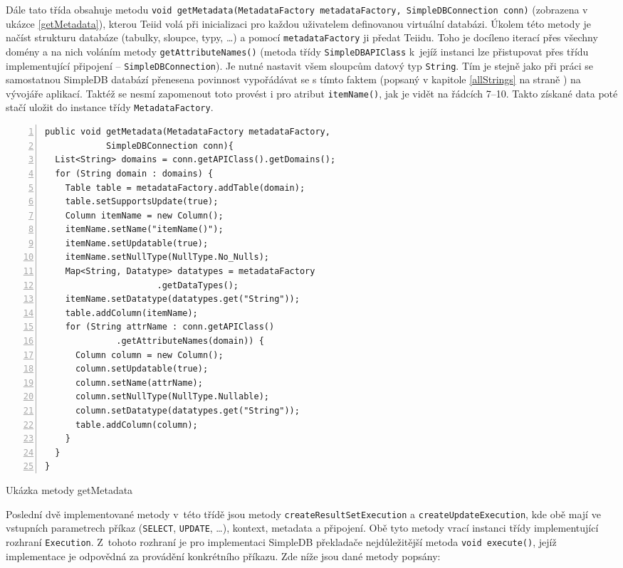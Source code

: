\documentclass[oneside,12pt]{fithesis2}
\begin{document}
Dále tato třída obsahuje metodu \label{getMetadataChapter}\texttt{void getMetadata(Metadata\allowbreak Factory metadataFactory, SimpleDBConnection conn)} (zobrazena v ukázce \ref{getMetadata}), kterou Teiid volá při inicializaci pro každou uživatelem definovanou virtuální databázi. Úkolem této metody je načíst strukturu databáze (tabulky, sloupce, typy, \dots) a pomocí \texttt{metadataFactory} ji předat Teiidu. Toho je docíleno iterací přes všechny domény a na nich voláním metody \texttt{getAttributeNames()} (metoda třídy \texttt{SimpleDBAPIClass} k~jejíž instanci lze přistupovat přes třídu implementující připojení -- \texttt{SimpleDB\allowbreak Connection}). Je nutné nastavit všem sloupcům datový typ \texttt{String}. Tím je stejně jako při práci se samostatnou SimpleDB databází přenesena povinnost vypořádávat se s tímto faktem (popsaný v kapitole \ref{allStrings} na straně \pageref{allStrings}) na vývojáře aplikací. Taktéž se nesmí zapomenout toto provést i pro atribut  \texttt{itemName()}, jak je vidět na řádcích 7--10. Takto získané data poté stačí uložit do instance třídy \texttt{MetadataFactory}.

\begin{ukazka}[h]
 \begin{Verbatim}[fontsize=\small,numbers=left]
public void getMetadata(MetadataFactory metadataFactory, 
			SimpleDBConnection conn){
  List<String> domains = conn.getAPIClass().getDomains();
  for (String domain : domains) {
    Table table = metadataFactory.addTable(domain);
    table.setSupportsUpdate(true);
    Column itemName = new Column();
    itemName.setName("itemName()");
    itemName.setUpdatable(true);
    itemName.setNullType(NullType.No_Nulls);
    Map<String, Datatype> datatypes = metadataFactory
				      .getDataTypes();
    itemName.setDatatype(datatypes.get("String"));
    table.addColumn(itemName);
    for (String attrName : conn.getAPIClass()
			  .getAttributeNames(domain)) {
      Column column = new Column();
      column.setUpdatable(true);
      column.setName(attrName);
      column.setNullType(NullType.Nullable);
      column.setDatatype(datatypes.get("String"));
      table.addColumn(column);
    }
  }
}
 \end{Verbatim}
\caption{Ukázka metody getMetadata}
\label{getMetadata}
\end{ukazka}

Poslední dvě implementované metody v~této třídě jsou metody \texttt{createResultSetExecution} a \texttt{createUpdateExecution}, kde obě mají ve vstupních parametrech příkaz (\texttt{SELECT}, \texttt{UPDATE}, \dots), kontext, metadata a připojení. Obě tyto metody vrací instanci třídy implementující rozhraní \texttt{Execution}. Z~tohoto rozhraní je pro implementaci SimpleDB překladače nejdůležitější metoda \texttt{void execute()}, jejíž implementace je odpovědná za provádění konkrétního příkazu. Zde níže jsou dané metody popsány:
\end{document}

